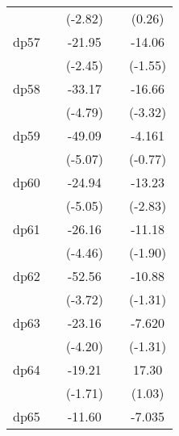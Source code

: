 {\begin{tabular}{l*{4}{c}}
            &                     &     (-2.82)         &                     &      (0.26)         \\
[1em]
dp57        &                     &      -21.95\sym{*}  &                     &      -14.06         \\
            &                     &     (-2.45)         &                     &     (-1.55)         \\
[1em]
dp58        &                     &      -33.17\sym{***}&                     &      -16.66\sym{***}\\
            &                     &     (-4.79)         &                     &     (-3.32)         \\
[1em]
dp59        &                     &      -49.09\sym{***}&                     &      -4.161         \\
            &                     &     (-5.07)         &                     &     (-0.77)         \\
[1em]
dp60        &                     &      -24.94\sym{***}&                     &      -13.23\sym{**} \\
            &                     &     (-5.05)         &                     &     (-2.83)         \\
[1em]
dp61        &                     &      -26.16\sym{***}&                     &      -11.18         \\
            &                     &     (-4.46)         &                     &     (-1.90)         \\
[1em]
dp62        &                     &      -52.56\sym{***}&                     &      -10.88         \\
            &                     &     (-3.72)         &                     &     (-1.31)         \\
[1em]
dp63        &                     &      -23.16\sym{***}&                     &      -7.620         \\
            &                     &     (-4.20)         &                     &     (-1.31)         \\
[1em]
dp64        &                     &      -19.21         &                     &       17.30         \\
            &                     &     (-1.71)         &                     &      (1.03)         \\
[1em]
dp65        &                     &      -11.60         &                     &      -7.035         \\

\end{tabular}}
